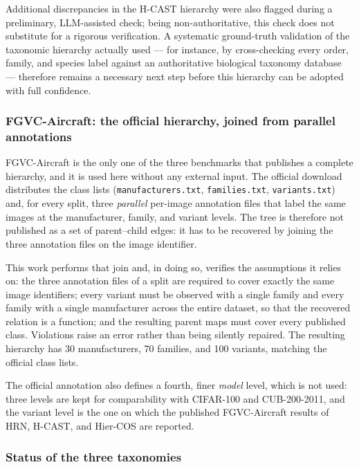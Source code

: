 Additional discrepancies in the H-CAST hierarchy were also flagged during a preliminary, LLM-assisted check; being non-authoritative, this check does not substitute for a rigorous verification. A systematic ground-truth validation of the taxonomic hierarchy actually used --- for instance, by cross-checking every order, family, and species label against an authoritative biological taxonomy database --- therefore remains a necessary next step before this hierarchy can be adopted with full confidence.

\subsubsection{FGVC-Aircraft: the official hierarchy, joined from parallel annotations}

FGVC-Aircraft \cite{maji2013fine} is the only one of the three benchmarks that publishes a complete hierarchy, and it is used here without any external input. The official download distributes the class lists (\texttt{manufacturers.txt}, \texttt{families.txt}, \texttt{variants.txt}) and, for every split, three \emph{parallel} per-image annotation files that label the same images at the manufacturer, family, and variant levels. The tree is therefore not published as a set of parent--child edges: it has to be recovered by joining the three annotation files on the image identifier.

This work performs that join and, in doing so, verifies the assumptions it relies on: the three annotation files of a split are required to cover exactly the same image identifiers; every variant must be observed with a single family and every family with a single manufacturer across the entire dataset, so that the recovered relation is a function; and the resulting parent maps must cover every published class. Violations raise an error rather than being silently repaired. The resulting hierarchy has 30 manufacturers, 70 families, and 100 variants, matching the official class lists.

The official annotation also defines a fourth, finer \emph{model} level, which is not used: three levels are kept for comparability with CIFAR-100 and CUB-200-2011, and the variant level is the one on which the published FGVC-Aircraft results of HRN, H-CAST, and Hier-COS are reported.

\subsubsection{Status of the three taxonomies}

